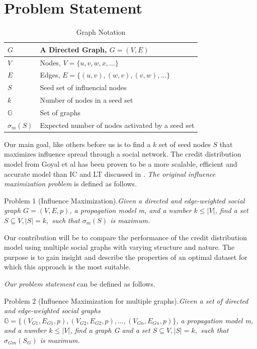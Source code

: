 \documentclass{acm_proc_article-sp}
\begin{document}
\section{Problem Statement}

\begin{table}
	\centering
	\begin{tabulary}{\linewidth}{|l|L|}
			\hline
			$G$ & A Directed Graph, $G = (V,E)$ \\\hline
			$V$ & Nodes, $V = \{u,v,w,x,...\}$ \\\hline
			$E$ & Edges, $E = \{(u, v),(w, v),(v,w),...\}$ \\\hline
			$S$ & Seed set of influencial nodes \\\hline
			$k$ & Number of nodes in a seed set \\\hline
			$\mathbb{G}$ & Set of graphs \\\hline
			$\sigma_m(S)$ & Expected number of nodes activated by a seed set \\\hline
	\end{tabulary}
	\caption{Graph Notation}
	\label{general-notation}
\end{table}

Our main goal, like others before us is to find a $k$ set of seed nodes $S$ that maximizes influence spread through a social network. The credit distribution model from Goyal et al has been proven to be a more scalable, efficient and accurate model than IC and LT discussed in \cite{kempe:maxspread}. \textit{The original influence maximization problem} is defined as follows.

\textsf{Problem 1 (Influence Maximization)}.\textit{Given a directed and edge-weighted social graph $ G = (V, E, p) $, a propagation model m, and a number $ k \leqslant |V| $, find a set $S \subseteq V , |S| = k,$ such that $\sigma_m (S)$ is maximum.}


Our contribution will be to compare the performance of the credit distribution model using multiple social graphs with varying structure and nature. The purpose is to gain insight and describe the properties of an optimal dataset for which this approach is the most suitable.

\textit{Our problem statement} can be defined as follows.

\textsf{Problem 2 (Influence Maximization for multiple graphs)}.\textit{Given a set of directed and edge-weighted social graphs \\ $ \mathbb{G} = \{(V_{G1}, E_{G1}, p),(V_{G2}, E_{G2}, p), ..., (V_{Gn}, E_{Gn}, p)\} $, a propagation model m, and a number $ k \leqslant |V| $, find a graph G and a set $S \subseteq V , |S| = k,$ such that $\sigma_{Gm}(S_G)$ is maximum.}
\end{document}
